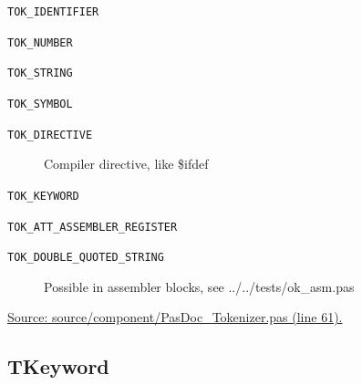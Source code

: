 \documentclass{report}
\newif\ifpdf
\begin{document}
\begin{list}{}
\begin{description}
\item[\texttt{TOK{\_}IDENTIFIER}] \label{PasDoc_Tokenizer-TOK_IDENTIFIER}
\index{}
 
\item[\texttt{TOK{\_}NUMBER}] \label{PasDoc_Tokenizer-TOK_NUMBER}
\index{}
 
\item[\texttt{TOK{\_}STRING}] \label{PasDoc_Tokenizer-TOK_STRING}
\index{}
 
\item[\texttt{TOK{\_}SYMBOL}] \label{PasDoc_Tokenizer-TOK_SYMBOL}
\index{}
 
\item[\texttt{TOK{\_}DIRECTIVE}] \label{PasDoc_Tokenizer-TOK_DIRECTIVE}
\index{}
Compiler directive, like {\$}ifdef
\item[\texttt{TOK{\_}KEYWORD}] \label{PasDoc_Tokenizer-TOK_KEYWORD}
\index{}
 
\item[\texttt{TOK{\_}ATT{\_}ASSEMBLER{\_}REGISTER}] \label{PasDoc_Tokenizer-TOK_ATT_ASSEMBLER_REGISTER}
\index{}
 
\item[\texttt{TOK{\_}DOUBLE{\_}QUOTED{\_}STRING}] \label{PasDoc_Tokenizer-TOK_DOUBLE_QUOTED_STRING}
\index{}
Possible in assembler blocks, see ../../tests/ok{\_}asm.pas
\end{description}
\par
\href{https://github.com/pasdoc/pasdoc/blob/master/source/component/PasDoc_Tokenizer.pas#L61}{Source: source/component/PasDoc{\_}Tokenizer.pas (line 61).}

\end{list}
\ifpdf
\subsection*{\large{\textbf{TKeyword}}\normalsize\hspace{1ex}\hrulefill}
\else
\end{document}
